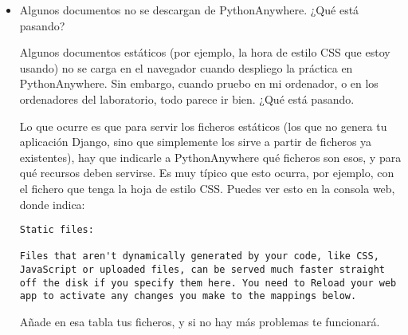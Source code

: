 \begin{itemize}
\item Algunos documentos no se descargan de PythonAnywhere. ¿Qué está pasando?

  Algunos documentos estáticos (por ejemplo, la hora de estilo CSS que estoy usando) no se carga en el navegador cuando despliego la práctica en PythonAnywhere. Sin embargo, cuando pruebo en mi ordenador, o en los ordenadores del laboratorio, todo parece ir bien. ¿Qué está pasando.

  Lo que ocurre es que para servir los ficheros estáticos (los que no genera tu aplicación Django, sino que simplemente los sirve a partir de ficheros ya existentes), hay que indicarle a PythonAnywhere qué ficheros son esos, y para qué recursos deben servirse. Es muy típico que esto ocurra, por ejemplo, con el fichero que tenga la hoja de estilo CSS. Puedes ver esto en la consola web, donde indica:

  \begin{verbatim}
Static files:

Files that aren't dynamically generated by your code, like CSS, JavaScript or uploaded files, can be served much faster straight off the disk if you specify them here. You need to Reload your web app to activate any changes you make to the mappings below.
\end{verbatim}

  Añade en esa tabla tus ficheros, y si no hay más problemas te funcionará.

\end{itemize}

